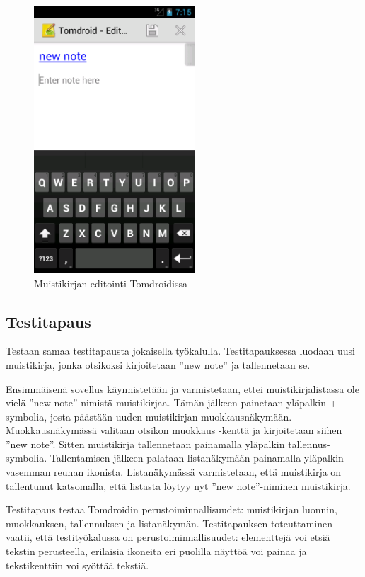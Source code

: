 \begin{figure}[htb]
\includegraphics[width=60mm]{tomdroid_editview.png}
\caption{Muistikirjan editointi Tomdroidissa} \label{tomdroid_editview}
\end{figure}

\subsection{Testitapaus}

Testaan samaa testitapausta jokaisella työkalulla. Testitapauksessa luodaan uusi muistikirja, jonka otsikoksi kirjoitetaan ''new note'' ja tallennetaan se.

Ensimmäisenä sovellus käynnistetään ja varmistetaan, ettei muistikirjalistassa ole vielä ''new note''-nimistä muistikirjaa. Tämän jälkeen painetaan yläpalkin +-symbolia, josta päästään uuden muistikirjan muokkausnäkymään. Muokkausnäkymässä valitaan otsikon muokkaus -kenttä ja kirjoitetaan siihen ''new note''. Sitten muistikirja tallennetaan painamalla yläpalkin tallennus-symbolia. Tallentamisen jälkeen palataan listanäkymään painamalla yläpalkin vasemman reunan ikonista. Listanäkymässä varmistetaan, että muistikirja on tallentunut katsomalla, että listasta löytyy nyt ''new note''-niminen muistikirja.

Testitapaus testaa Tomdroidin perustoiminnallisuudet: muistikirjan luonnin, muokkauksen, tallennuksen ja listanäkymän. Testitapauksen toteuttaminen vaatii, että testityökalussa on perustoiminnallisuudet: elementtejä voi etsiä tekstin perusteella, erilaisia ikoneita eri puolilla näyttöä voi painaa ja tekstikenttiin voi syöttää tekstiä.


